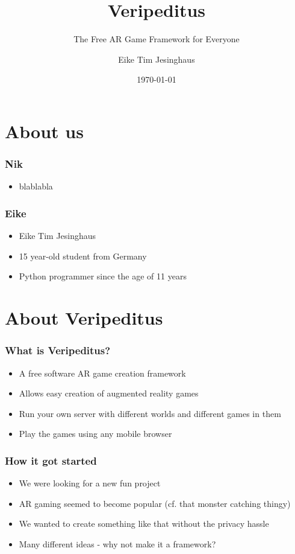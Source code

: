 \documentclass[aspectratio=43]{beamer}
\title{Veripeditus}
\subtitle{The Free AR Game Framework for Everyone}
\author{Eike Tim Jesinghaus}
\date{\today}
\institute{FOSDEM 2017}
\begin{document}
 \begin{frame}
  \titlepage
 \end{frame}

 \section{About us}

 \begin{frame}
  \frametitle{Nik}

  \begin{itemize}
   \item{blablabla}
  \end{itemize}
 \end{frame}

 \begin{frame}
  \frametitle{Eike}

  \begin{itemize}
   \item{Eike Tim Jesinghaus}
   \item{15 year-old student from Germany}
   \item{Python programmer since the age of 11 years}
  \end{itemize}
 \end{frame}

 \section{About Veripeditus}

 \begin{frame}
  \frametitle{What is Veripeditus?}

  \begin{itemize}
   \item{A free software AR game creation framework}
   \item{Allows easy creation of augmented reality games}
   \item{Run your own server with different worlds and different games in them}
   \item{Play the games using any mobile browser}
  \end{itemize}
 \end{frame}

 \begin{frame}
  \frametitle{How it got started}

  \begin{itemize}
   \item{We were looking for a new fun project}
   \item{AR gaming seemed to become popular (cf. that monster catching thingy)}
   \item{We wanted to create something like that without the privacy hassle}
   \item{Many different ideas - why not make it a framework?}
  \end{itemize}
 \end{frame}
\end{document}

